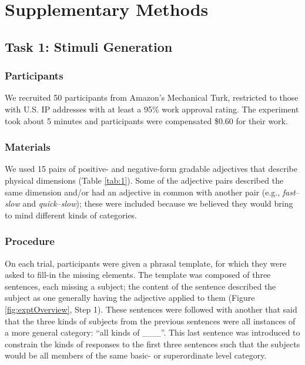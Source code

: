 \documentclass[doc]{apa6}
\begin{document}
\newpage







\newpage

\section{Supplementary Methods}

\subsection{Task 1: Stimuli Generation}

\subsubsection{Participants}

We recruited 50 participants from Amazon's Mechanical
Turk, restricted to those with U.S. IP addresses with at least a
95\% work approval rating. The experiment took about 5 minutes and
participants were compensated \$0.60 for their work.

\subsubsection{Materials}

We used 15 pairs of positive- and negative-form gradable adjectives that describe physical dimensions (Table \ref{tab:1}).
Some of the adjective pairs described the same dimension and/or had an adjective in common with another pair (e.g., \emph{fast}--\emph{slow} and \emph{quick}--\emph{slow}); these were included because we believed they would bring to mind different kinds of categories.

\subsubsection{Procedure}

On each trial, participants were given a phrasal template, for which they were asked to fill-in the missing elements.
The template was composed of three sentences, each missing a subject; the content of the sentence described the subject as one generally having the adjective applied to them (Figure \ref{fig:exptOverview}, Step 1). 
These sentences were followed with another that said that the three kinds of subjects from the previous sentences were all instances of a more general category: ``all kinds of \_\_\_''.
This last sentence was introduced to constrain the kinds of responses to the first three sentences such that the subjects would be all members of the same basic- or superordinate level category. 
\end{document}
